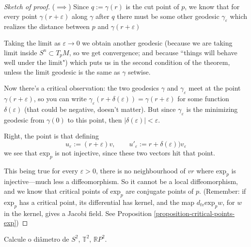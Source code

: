 \begin{proof}[Sketch of proof]
($\implies$) Since $q:=\gamma(r)$ is the cut
point of $p$, we know that for every point
$\gamma(r+\varepsilon)$ along $\gamma$ after
$q$ there must be some other geodesic
$\gamma_\varepsilon$ which realizes the
distance between $p$ and
$\gamma(r+\varepsilon)$

Taking the limit as $\varepsilon \to 0$ we
obtain another geodesic
(because we are taking limit inside $S^n
\subset T_pM$, so we get convergence;
and because ``things will behave well under
the limit")
which puts us in the second condition of the
theorem,
unless the limit geodesic is the same as
$\gamma$ setwise.

Now there's a critical observation:
the two geodesics $\gamma$ and
$\gamma_\varepsilon$ meet at the point
 $\gamma(r+\varepsilon)$, so you can write
 $\gamma_\varepsilon(r+\delta(\varepsilon))=
 \gamma(r+\varepsilon)$
 for some function $\delta(\varepsilon)$
 (that could be negative, doesn't
 matter).
 But since $\gamma_\varepsilon$ is the
 minimizing
 geodesic from $\gamma(0)$ to this point,
 then
 $|\delta(\varepsilon)|<\varepsilon$.

Right, the point is that defining
$$
u_\varepsilon:=(r+\varepsilon)v,\qquad
u'_\varepsilon:=r+\delta(\varepsilon))
v_\varepsilon
$$
we see that $\text{exp}_p$ is not injective,
since these two vectors
hit that point.

This being true for every $\varepsilon>0$,
there is no neighbourhood of $vr$
where $\text{exp}_p$ is injective---much less
a diffeomorphism.
So it cannot be a local diffeomorphism, and
we know that critical points of
$\text{exp}_p$ are conjugate points of $p$.
(Remember: if
$\text{exp}_p$ has a critical point, its
differential has kernel,
and the map $d_{tv}\text{exp}_pw$, for $w$ in
the kernel, gives
a Jacobi field. See Proposition
\ref{proposition-critical-points-exp})
\end{proof}

\begin{exercise}
\label{exercise-diametros}
Calcule o diâmetro de $S^2$, $\mathbb{T}^2$,
$\mathbb{R}P^{2}$.
\end{exercise}

